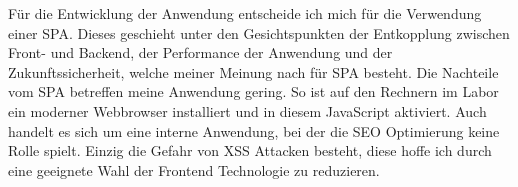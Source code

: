 Für die Entwicklung der Anwendung entscheide ich mich für die Verwendung einer SPA. Dieses geschieht unter den Gesichtspunkten der Entkopplung zwischen Front- und Backend, der Performance der Anwendung und der Zukunftssicherheit, welche meiner Meinung nach für SPA besteht. Die Nachteile vom SPA betreffen meine Anwendung gering. So ist auf den Rechnern im Labor ein moderner Webbrowser installiert und in diesem JavaScript aktiviert. Auch handelt es sich um eine interne Anwendung, bei der die SEO Optimierung keine Rolle spielt. Einzig die Gefahr von XSS Attacken besteht, diese hoffe ich durch eine geeignete Wahl der Frontend Technologie zu reduzieren.